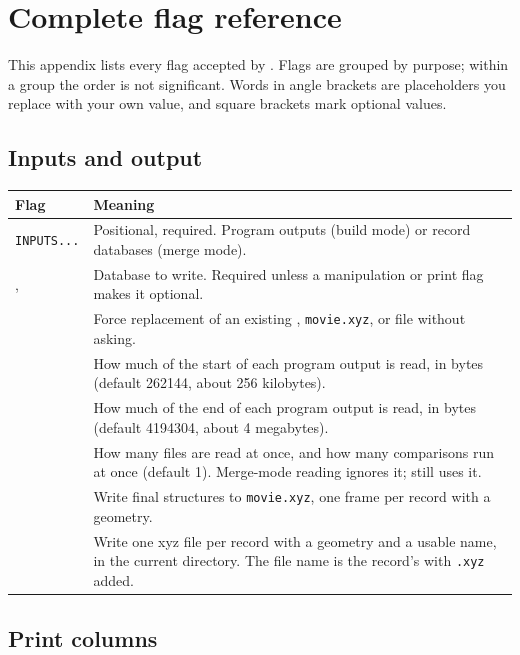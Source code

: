 \section{Complete flag reference}\label{app:flags}

This appendix lists every flag accepted by \CJKQC{} \ManualVersion. Flags are grouped
by purpose; within a group the order is not significant. Words in angle
brackets are placeholders you replace with your own value, and square brackets
mark optional values.

\subsection{Inputs and output}

\begin{longtable}{@{}L{4.0cm}L{9.5cm}@{}}
\toprule
\textbf{Flag} & \textbf{Meaning} \\
\midrule
\endhead
\texttt{INPUTS...} & Positional, required. Program outputs (build mode) or
record databases (merge mode). \\
,  & Database to write. Required unless a
manipulation or print flag makes it optional. \\
 & Force replacement of an existing ,
\texttt{movie.xyz}, or  file without asking. \\
 & How much of the start of each program output is read,
in bytes (default 262144, about 256 kilobytes). \\
 & How much of the end of each program output is read,
in bytes (default 4194304, about 4 megabytes). \\
 & How many files are read at once, and how many
 comparisons run at once (default 1). Merge-mode reading
ignores it;  still uses it. \\
 & Write final structures to \texttt{movie.xyz}, one frame per
 record with a geometry. \\
 & Write one xyz file per  record with a geometry and
a usable name, in the current directory. The file name is the record's
 with \texttt{.xyz} added. \\
\bottomrule
\end{longtable}

\subsection{Print columns}

